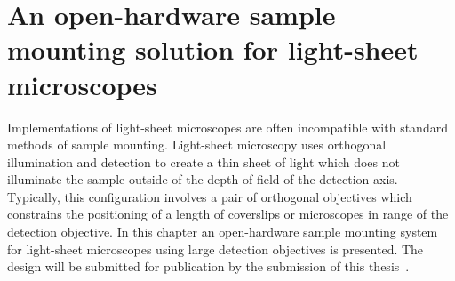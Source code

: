 \ifpdf{}
    \graphicspath{{Chapters/chamber/Figs/Raster/}{Chapters/chamber/Figs/PDF/}{Chapters/chamber/Figs/}}
\else
    \graphicspath{{Chapters/chamber/Figs/Vector/}{Chapters/chamber/Figs/}}
\fi


\chapter{An open-hardware sample mounting solution for light-sheet microscopes}\label{chapter:chamber}

Implementations of light-sheet microscopes are often incompatible with standard methods of sample mounting.
Light-sheet microscopy uses orthogonal illumination and detection to create a thin sheet of light which does not illuminate the sample outside of the depth of field of the detection axis.
Typically, this configuration involves a pair of orthogonal objectives which constrains the positioning of a length of coverslips or microscopes in range of the detection objective.
In this chapter an \gls{open-hardware} sample mounting system for light-sheet microscopes using large detection objectives is presented.
The design will be submitted for publication by the submission of this thesis~\cite{russellOpenhardwareSampleMounting}.

\pagebreak

